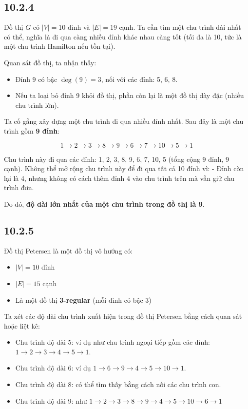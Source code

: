 \documentclass{article}
\begin{document}
	\subsection*{10.2.4}
	Đồ thị $G$ có $|V| = 10$ đỉnh và $|E| = 19$ cạnh. Ta cần tìm một chu trình dài nhất có thể, nghĩa là đi qua càng nhiều đỉnh khác nhau càng tốt (tối đa là 10, tức là một chu trình Hamilton nếu tồn tại).
	
	Quan sát đồ thị, ta nhận thấy:
	\begin{itemize}
		\item Đỉnh 9 có bậc $\deg(9) = 3$, nối với các đỉnh: 5, 6, 8.
		\item Nếu ta loại bỏ đỉnh 9 khỏi đồ thị, phần còn lại là một đồ thị dày đặc (nhiều chu trình lớn).
	\end{itemize}
	
	Ta cố gắng xây dựng một chu trình đi qua nhiều đỉnh nhất. Sau đây là một chu trình gồm \textbf{9 đỉnh}:
	
	\[
	1 \to 2 \to 3 \to 8 \to 9 \to 6 \to 7 \to 10 \to 5 \to 1
	\]
	
	Chu trình này đi qua các đỉnh: 1, 2, 3, 8, 9, 6, 7, 10, 5 (tổng cộng 9 đỉnh, 9 cạnh). Không thể mở rộng chu trình này để đi qua tất cả 10 đỉnh vì:
	- Đỉnh còn lại là 4, nhưng không có cách thêm đỉnh 4 vào chu trình trên mà vẫn giữ chu trình đơn.
	
	Do đó, \textbf{độ dài lớn nhất của một chu trình trong đồ thị là 9}.

	\subsection*{10.2.5}
	Đồ thị Petersen là một đồ thị vô hướng có:
	\begin{itemize}
		\item $|V| = 10$ đỉnh
		\item $|E| = 15$ cạnh
		\item Là một đồ thị \textbf{3-regular} (mỗi đỉnh có bậc 3)
	\end{itemize}
	
	Ta xét các độ dài chu trình xuất hiện trong đồ thị Petersen bằng cách quan sát hoặc liệt kê:
	
	\begin{itemize}
		\item Chu trình độ dài 5: ví dụ như chu trình ngoại tiếp gồm các đỉnh: $1 \to 2 \to 3 \to 4 \to 5 \to 1$.
		\item Chu trình độ dài 6: ví dụ $1 \to 6 \to 9 \to 4 \to 5 \to 10 \to 1$.
		\item Chu trình độ dài 8: có thể tìm thấy bằng cách nối các chu trình con.
		\item Chu trình độ dài 9: như $1 \to 2 \to 3 \to 8 \to 9 \to 4 \to 5 \to 10 \to 6 \to 1$
	\end{itemize}
	
\end{document}
